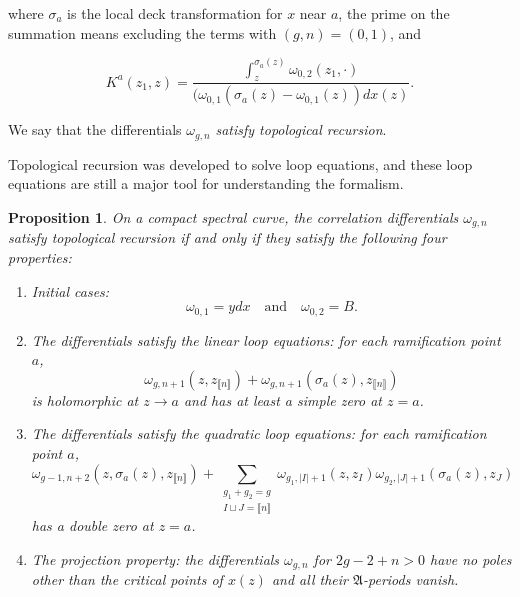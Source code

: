 \documentclass[10pt,a4paper,oneside,no-math,reqno]{amsart}%
\theoremstyle{plain}
\newtheorem{proposition}[theorem]{Proposition}
\theoremstyle{definition}
\theoremstyle{remark}
\numberwithin{equation}{section}
\newcommand{\1}{\mathds{1}}
\newcommand{\<}{\langle}
\renewcommand{\>}{\rangle}
\begin{document}
where $\sigma_a$ is the local deck transformation for $ x$ near $ a$, the prime on the summation means excluding the terms with $ (g,n) = (0,1)$, and 

\begin{equation}
    K^a(z_1,z)
    =
    \frac{\int_{z}^{\sigma_a(z)}\omega_{0,2}(z_1,\cdot)}{(\omega_{0,1}(\sigma_a(z)-\omega_{0,1}(z))dx(z)}.
\end{equation}


We say that the differentials $\omega_{g,n}$ \emph{satisfy topological recursion}.

Topological recursion was developed to solve loop equations, and these loop equations are still a major tool for understanding the formalism. 
\begin{proposition}\label{LoopEquations}
    On a compact spectral curve, the correlation differentials $\omega_{g,n}$ satisfy topological recursion if and only if they satisfy the following four properties:
    \begin{enumerate}
        \item \emph{Initial cases}:
        \begin{equation}
            \omega_{0,1}=ydx\quad\textrm{and}\quad \omega_{0,2}=B.
        \end{equation}
        \item The differentials satisfy the \emph{linear loop equations}: for each ramification point $a$,
        \begin{equation}
            \omega_{g,n+1}(z,z_{\llbracket n \rrbracket})+\omega_{g,n+1}(\sigma_a(z),z_{\llbracket n \rrbracket})
        \end{equation}
        is holomorphic at $z\to a$ and has at least a simple zero at $z=a$.
        \item The differentials satisfy the \emph{quadratic loop equations}: for each ramification point $a$,
        \begin{equation}
            \omega_{g-1,n+2}(z,\sigma_a(z),z_{\llbracket n \rrbracket}) + \sum_{\substack{g_1+g_2=g\\I\sqcup J = \llbracket n \rrbracket}} \omega_{g_1,|I|+1}(z,z_{I})\omega_{g_2,|J|+1}(\sigma_a(z),z_{J})
        \end{equation}
        has a double zero at $ z = a$.
        \item The \emph{projection property}: the differentials $\omega_{g,n}$ for $2g-2+n>0$ have no poles other than the critical points of $x(z)$ and all their $\mathfrak{A}$-periods vanish.\label{ProjectionProperty}
    \end{enumerate}
\end{proposition}
\end{document}
